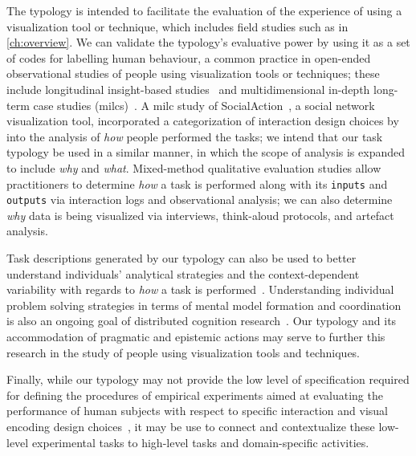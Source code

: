 
The typology is intended to facilitate the evaluation of the experience of using a visualization tool or technique, which includes field studies such as in \autoref{ch:overview}.
We can validate the typology's evaluative power by using it as a set of codes for labelling human behaviour, a common practice in open-ended observational studies of people using visualization tools or techniques; these include longitudinal insight-based studies~\cite{North2011} and multidimensional in-depth long-term case studies ({\sc milc}s)~\cite{Shneiderman2006}.
A {\sc milc} study of SocialAction~\cite{Perer2009}, a social network visualization tool, incorporated a categorization of interaction design choices by \citet{Yi2007} into the analysis of {\it how} people performed the tasks; we intend that our task typology be used in a similar manner, in which the scope of analysis is expanded to include {\it why} and {\it what}.
Mixed-method qualitative evaluation studies allow practitioners to determine {\it how} a task is performed along with its {\tt inputs} and {\tt outputs} via interaction logs and observational analysis; we can also determine {\it why} data is being visualized via interviews, think-aloud protocols, and artefact analysis.

Task descriptions generated by our typology can also be used to better understand individuals' analytical strategies and the context-dependent variability with regards to {\it how} a task is performed~\cite{Vicente1999,Ziemkiewicz2012}.
Understanding individual problem solving strategies in terms of mental model formation and coordination is also an ongoing goal of distributed cognition research~\cite{Hollan2000,Liu2010}.
Our typology and its accommodation of pragmatic and epistemic actions may serve to further this research in the study of people using visualization tools and techniques.

Finally, while our typology may not provide the low level of specification required for defining the procedures of empirical experiments aimed at evaluating the performance of human subjects with respect to specific interaction and visual encoding design choices~\cite{Lam2012}, it may be use to connect and contextualize these low-level experimental tasks to high-level tasks and domain-specific activities.

